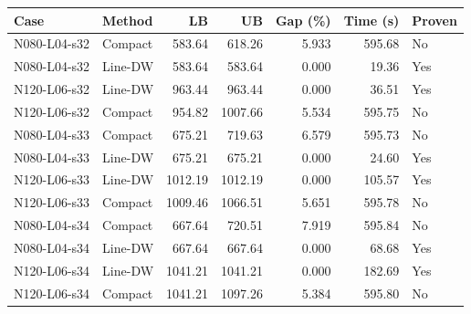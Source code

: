 \begin{tabular}{llrrrrl}
\hline
Case & Method & LB & UB & Gap (\%) & Time (s) & Proven \\
\hline
N080-L04-s32 & Compact & 583.64 & 618.26 & 5.933 & 595.68 & No \\
N080-L04-s32 & Line-DW & 583.64 & 583.64 & 0.000 & 19.36 & Yes \\
N120-L06-s32 & Line-DW & 963.44 & 963.44 & 0.000 & 36.51 & Yes \\
N120-L06-s32 & Compact & 954.82 & 1007.66 & 5.534 & 595.75 & No \\
N080-L04-s33 & Compact & 675.21 & 719.63 & 6.579 & 595.73 & No \\
N080-L04-s33 & Line-DW & 675.21 & 675.21 & 0.000 & 24.60 & Yes \\
N120-L06-s33 & Line-DW & 1012.19 & 1012.19 & 0.000 & 105.57 & Yes \\
N120-L06-s33 & Compact & 1009.46 & 1066.51 & 5.651 & 595.78 & No \\
N080-L04-s34 & Compact & 667.64 & 720.51 & 7.919 & 595.84 & No \\
N080-L04-s34 & Line-DW & 667.64 & 667.64 & 0.000 & 68.68 & Yes \\
N120-L06-s34 & Line-DW & 1041.21 & 1041.21 & 0.000 & 182.69 & Yes \\
N120-L06-s34 & Compact & 1041.21 & 1097.26 & 5.384 & 595.80 & No \\
\hline
\end{tabular}
